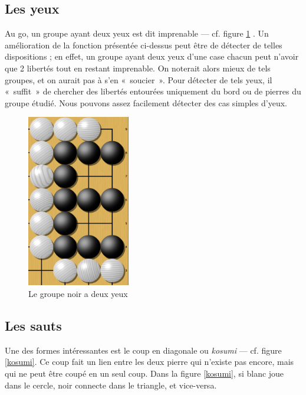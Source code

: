 \documentclass[11pt,a4paper,titlepage,french]{article}
\begin{document}
		\subsection{Les yeux}
			Au go, un groupe ayant deux yeux est dit imprenable --- cf. figure \ref{deuxyeux} . Un amélioration de la fonction présentée ci-dessus peut être de détecter de telles dispositions ; en effet, un groupe ayant deux yeux d'une case chacun peut n'avoir que 2 libertés tout en restant imprenable. On noterait alors mieux de tels groupes, et on aurait pas à s'en «~soucier~». Pour détecter de tels yeux, il «~suffit~» de chercher des libertés entourées uniquement du bord ou de pierres du groupe étudié. Nous pouvons assez facilement détecter des cas simples d'yeux.

			\begin{figure}[hbt]
			\label{deuxyeux}
			\begin{center}
			\includegraphics[width=0.4\textwidth]{deuxyeux.png}
			\end{center}
			\caption{Le groupe noir a deux yeux}
			\end{figure}

		\subsection{Les sauts}

			Une des formes intéressantes est le coup en diagonale ou \emph{kosumi} --- cf. figure \ref{kosumi}. Ce coup fait un lien entre les deux pierre qui n'existe pas encore, mais qui ne peut être coupé en un seul coup. Dans la figure \ref{kosumi}, si blanc joue dans le cercle, noir connecte dans le triangle, et vice-versa.
\end{document}
